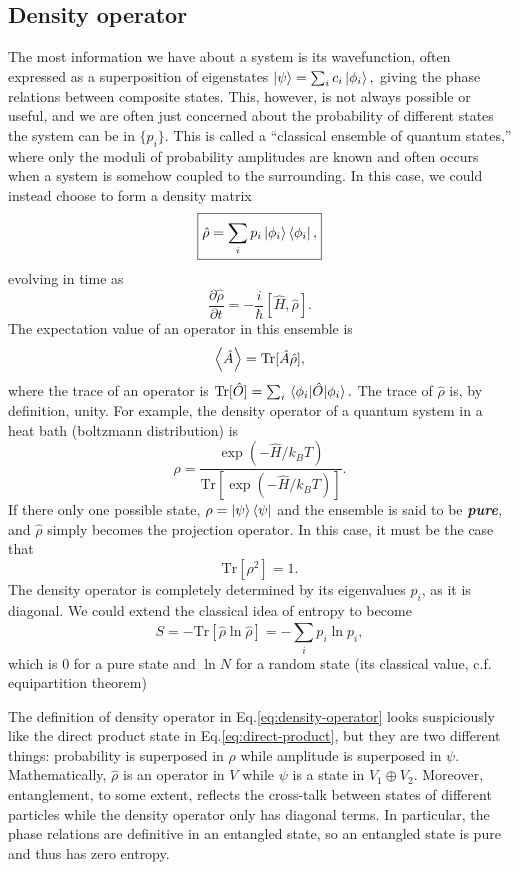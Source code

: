 \documentclass{article}
\theoremstyle{nonumberplain}
\begin{document}
\subsection{Density operator}
The most information we have about a system is its wavefunction, often expressed as a superposition of eigenstates 
\(\ket{\psi } = \sum_{i}^{} c_i \ket{\phi_i},\) giving the phase relations between composite states. This, however, is not always possible or useful, and we are often just concerned about the probability of different states the system can be in $\{p_i\}.$ This is called a ``classical ensemble of quantum states,'' where only the moduli of probability amplitudes are known and often occurs when a system is somehow coupled to the surrounding. In this case, we could instead choose to form a density matrix 
\begin{equation}
    \boxed{\hat{\rho} = \sum_{i}^{} p_i \ket{\phi_i} \bra{\phi_i},} \label{eq:density-operator}
\end{equation}
evolving in time as
\[
    \boxed{
        \frac{\partial \hat{\rho} }{\partial t} = -\frac{i}{\hbar }[\hat{H}, \hat{\rho}].
    }
\]
The expectation value of an operator in this ensemble is 
\[
    \expval{\hat{A}} = \mathrm{Tr}[\hat{A} \hat{\rho}], 
\]
where the trace of an operator is $\mathrm{Tr}[\hat{O}] = \sum_{i}^{} \mel{\phi_i}{\hat{O}}{\phi_i}.$ The trace of $\hat{\rho}$ is, by definition, unity. For example, the density operator of a quantum system in a heat bath (boltzmann distribution) is 
\[
    \rho = \frac{\mathrm{\exp}(-\hat{H} / k_B T) }{\mathrm{Tr}[\mathrm{\exp}(-\hat{H} / k_B T)] }.
\]
If there only one possible state, $\rho = \ket{\psi}\bra{\psi}$ and the ensemble is said to be \textit{\textbf{pure},} and $\hat{\rho}$ simply becomes the projection operator. In this case, it must be the case that
\[
    \mathrm{Tr}[\rho^{2}] = 1.  
\]
The density operator is completely determined by its eigenvalues $p_i$, as it is diagonal. We could extend the classical idea of entropy to become
\[
    S = - \mathrm{Tr} [\hat{\rho}  \ln \hat{\rho} ] = -\sum_{i}^{} p_i \ln p_i, 
\]
which is $0$ for a pure state and $\ln N$ for a random state (its classical value, c.f. equipartition theorem) 

The definition of density operator in Eq.\eqref{eq:density-operator} looks suspiciously like the direct product state in Eq.\eqref{eq:direct-product}, but they are two different things: probability is superposed in $\rho$ while amplitude is superposed in $\psi.$ Mathematically, $\hat{\rho}$ is an operator in $V$ while $\psi$ is a state in $V_1 \oplus V_2.$ Moreover, entanglement, to some extent, reflects the cross-talk between states of different particles while the density operator only has diagonal terms. In particular, the phase relations are definitive in an entangled state, so an entangled state is pure and thus has zero entropy. 
\end{document}
